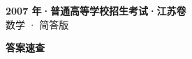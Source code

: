 \documentclass[zihao=-4, a4paper]{ctexart}
\begin{document}
\begin{center}
  {\Large\bfseries 2007 年·普通高等学校招生考试·江苏卷}\\[4pt]
  {\large 数学 · 简答版}
\end{center}
\medskip
{}

\clearpage
{}
\begin{center}{\Large\bfseries 答案速查}\end{center}
\medskip

\end{document}
